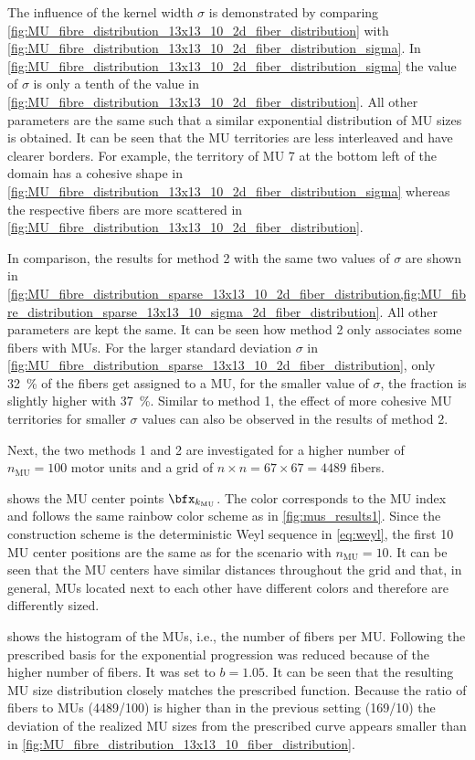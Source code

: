 The influence of the kernel width $\sigma$ is demonstrated by comparing \cref{fig:MU_fibre_distribution_13x13_10_2d_fiber_distribution} with \cref{fig:MU_fibre_distribution_13x13_10_2d_fiber_distribution_sigma}. In \cref{fig:MU_fibre_distribution_13x13_10_2d_fiber_distribution_sigma} the value of $\sigma$ is only a tenth of the value in \cref{fig:MU_fibre_distribution_13x13_10_2d_fiber_distribution}. All other parameters are the same such that a similar exponential distribution of MU sizes is obtained. It can be seen that the MU territories are less interleaved and have clearer borders. For example, the territory of MU 7 at the bottom left of the domain has a cohesive shape in \cref{fig:MU_fibre_distribution_13x13_10_2d_fiber_distribution_sigma} whereas the respective fibers are more scattered in \cref{fig:MU_fibre_distribution_13x13_10_2d_fiber_distribution}.

In comparison, the results for method 2 with the same two values of $\sigma$ are shown in \cref{fig:MU_fibre_distribution_sparse_13x13_10_2d_fiber_distribution,fig:MU_fibre_distribution_sparse_13x13_10_sigma_2d_fiber_distribution}. All other parameters are kept the same. It can be seen how method 2 only associates some fibers with MUs. For the larger standard deviation $\sigma$ in \cref{fig:MU_fibre_distribution_sparse_13x13_10_2d_fiber_distribution}, only \SI{32}{\percent} of the fibers get assigned to a MU, for the smaller value of $\sigma$, the fraction is slightly higher with \SI{37}{\percent}. Similar to method 1, the effect of more cohesive MU territories for smaller $\sigma$ values can also be observed in the results of method 2.

Next, the two methods 1 and 2 are investigated for a higher number of $n_\text{MU}=100$ motor units and a grid of $n \times n=67 \times 67 = \num{4489}$ fibers.

 shows the MU center points $\bfx_{k_\text{MU}}$. The color corresponds to the MU index and follows the same rainbow color scheme as in \cref{fig:mus_results1}. Since the construction scheme is the deterministic Weyl sequence in \cref{eq:weyl}, the first 10 MU center positions are the same as for the scenario with $n_\text{MU}=10$. It can be seen that the MU centers have similar distances throughout the grid and that, in general, MUs located next to each other have different colors and therefore are differently sized.

 shows the histogram of the MUs, i.e., the number of fibers per MU. Following \cite{Enoka2001} the prescribed basis for the exponential progression was reduced because of the higher number of fibers. It was set to $b=1.05$. It can be seen that the resulting MU size distribution closely matches the prescribed function. Because the ratio of fibers to MUs (4489/100) is higher than in the previous setting (169/10) the deviation of the realized MU sizes from the prescribed curve appears smaller than in \cref{fig:MU_fibre_distribution_13x13_10_fiber_distribution}.

